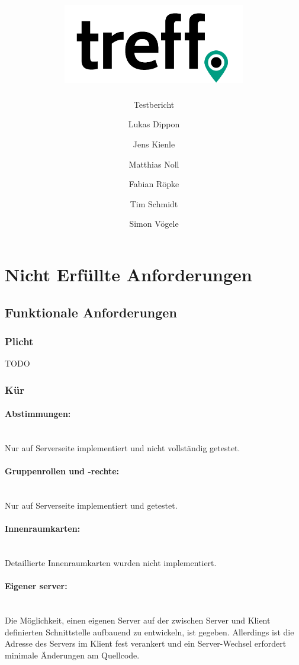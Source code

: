 \documentclass[parskip=full,11pt]{scrartcl}
\title{\includegraphics[width = 80mm]{images/logo_crop.png}}
\subtitle{\huge Testbericht}
\author{Lukas Dippon
        \and Jens Kienle
        \and Matthias Noll
        \and Fabian Röpke
        \and Tim Schmidt
        \and Simon Vögele}
\begin{document}
\maketitle
\thispagestyle{empty} %

\pagebreak
\tableofcontents

\pagebreak
\section{Nicht Erfüllte Anforderungen}
\subsection{Funktionale Anforderungen}
\subsubsection{Plicht}
TODO
\subsubsection{Kür}
\paragraph{\small Abstimmungen:} \hspace{0pt} \\
Nur auf Serverseite implementiert und nicht vollständig getestet.

\paragraph{\small Gruppenrollen und -rechte:} \hspace{0pt} \\
Nur auf Serverseite implementiert und getestet.

\paragraph{\small Innenraumkarten:} \hspace{0pt} \\
Detaillierte Innenraumkarten wurden nicht implementiert.

\paragraph{\small Eigener server:} \hspace{0pt} \\
Die Möglichkeit, einen eigenen Server auf der zwischen Server und Klient
definierten Schnittstelle aufbauend zu entwickeln, ist gegeben.
Allerdings ist die Adresse des Servers im Klient fest verankert und ein
Server-Wechsel erfordert minimale Änderungen am Quellcode.
\end{document}
